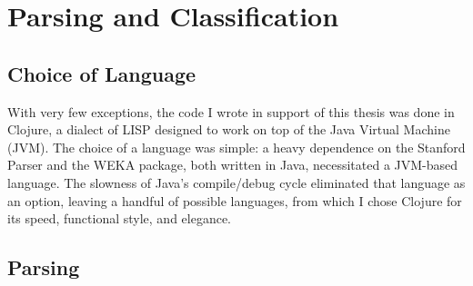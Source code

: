 \documentclass[main.tex]{subfiles}
\begin{document}
\section{Parsing and Classification}

\subsection{Choice of Language}

With very few exceptions, the code I wrote in support of this thesis was done in Clojure, a dialect of LISP designed to work on top of the Java Virtual Machine (JVM). The choice of a language was simple: a heavy dependence on the Stanford Parser and the WEKA package, both written in Java, necessitated a JVM-based language. The slowness of Java's compile/debug cycle eliminated that language as an option, leaving a handful of possible languages, from which I chose Clojure for its speed, functional style, and elegance.

\subsection{Parsing}
\end{document}
